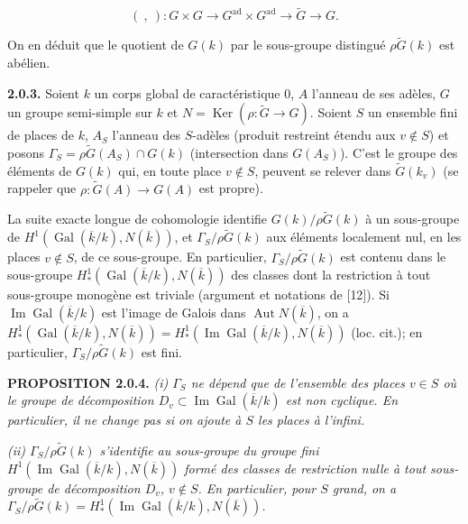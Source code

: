 \documentclass[10pt,a4paper]{article}
\begin{document}
\[
(\ ,\ ):G\times G\longrightarrow G^{\mathrm{ad}}\times G^{\mathrm{ad}}\longrightarrow\widetilde G\longrightarrow G.
\]

On en déduit que le quotient de \(G(k)\) par le sous-groupe distingué \(\rho\widetilde G(k)\) est abélien.

\textbf{2.0.3.} Soient \(k\) un corps global de caractéristique 0, \(A\) l'anneau de ses adèles, \(G\) un groupe semi-simple sur \(k\) et \(N=\operatorname{Ker}(\rho:\widetilde G\to G)\). Soient \(S\) un ensemble fini de places de \(k\), \(A_S\) l'anneau des \(S\)-adèles (produit restreint étendu aux \(v\notin S\)) et posons \(\Gamma_S=\rho\widetilde G(A_S)\cap G(k)\) (intersection dans \(G(A_S)\)). C'est le groupe des éléments de \(G(k)\) qui, en toute place \(v\notin S\), peuvent se relever dans \(\widetilde G(k_v)\) (se rappeler que \(\rho:\widetilde G(A)\to G(A)\) est propre).

La suite exacte longue de cohomologie identifie \(G(k)/\rho\widetilde G(k)\) à un sous-groupe de \(H^1(\operatorname{Gal}(\overline k/k),N(\overline k))\), et \(\Gamma_S/\rho\widetilde G(k)\) aux éléments localement nul, en les places \(v\notin S\), de ce sous-groupe. En particulier, \(\Gamma_S/\rho\widetilde G(k)\) est contenu dans le sous-groupe \(H_*^1(\operatorname{Gal}(\overline k/k),N(\overline k))\) des classes dont la restriction à tout sous-groupe monogène est triviale (argument et notations de {[}12{]}). Si \(\operatorname{Im}\operatorname{Gal}(\overline k/k)\) est l'image de Galois dans \(\operatorname{Aut}N(\overline k)\), on a \(H_*^1(\operatorname{Gal}(\overline k/k),N(\overline k))=H_*^1(\operatorname{Im}\operatorname{Gal}(\overline k/k),N(\overline k))\) (loc. cit.); en particulier, \(\Gamma_S/\rho\widetilde G(k)\) est fini.

\textbf{PROPOSITION 2.0.4.} \emph{(i) \(\Gamma_S\) ne dépend que de l'ensemble des places \(v\in S\) où le groupe de décomposition \(D_v\subset\operatorname{Im}\operatorname{Gal}(\overline k/k)\) est non cyclique. En particulier, il ne change pas si on ajoute à \(S\) les places à l'infini.}

\emph{(ii) \(\Gamma_S/\rho\widetilde G(k)\) s'identifie au sous-groupe du groupe fini \(H^1(\operatorname{Im}\operatorname{Gal}(\overline k/k),N(\overline k))\) formé des classes de restriction nulle à tout sous-groupe de décomposition \(D_v\), \(v\notin S\). En particulier, pour \(S\) grand, on a \(\Gamma_S/\rho\widetilde G(k)=H_*^1(\operatorname{Im}\operatorname{Gal}(\overline k/k),N(\overline k))\).}
\end{document}

